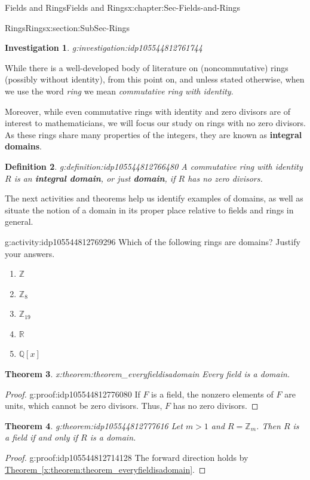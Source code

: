\documentclass[oneside,10pt,]{book}
\newcommand{\xreffont}{\relax}
\newcommand{\terminology}[1]{\textbf{#1}}
\numberwithin{equation}{section}
\def\Z{{\mathbb Z}}
\def\Q{{\mathbb Q}}
\def\R{{\mathbb R}}
\newtheorem{theorem}{Theorem}[section]
\newtheorem{definition}[theorem]{Definition}
\newtheorem{investigation}[theorem]{Investigation}
\begin{document}
\begin{chapterptx}{Fields and Rings}{}{Fields and Rings}{}{}{x:chapter:Sec-Fields-and-Rings}
\begin{sectionptx}{Rings}{}{Rings}{}{}{x:section:SubSec-Rings}
\begin{investigation}{}{g:investigation:idp105544812761744}
\end{investigation}%
While there is a well-developed body of literature on (noncommutative) rings (possibly without identity), from this point on, and unless stated otherwise, when we use the word \emph{ring} we mean \emph{commutative ring with identity}.%
\par
Moreover, while even commutative rings with identity and zero divisors are of interest to mathematicians, we will focus our study on rings with no zero divisors. As these rings share many properties of the integers, they are known as \terminology{integral domains}.%
\begin{definition}{}{g:definition:idp105544812766480}%
%
%
A commutative ring with identity \(R\) is an \terminology{integral domain}, or just \terminology{domain}, if \(R\) has no zero divisors.%
\end{definition}
The next activities and theorems help us identify examples of domains, as well as situate the notion of a domain in its proper place relative to fields and rings in general.%
\begin{activity}{}{g:activity:idp105544812769296}%
Which of the following rings are domains? Justify your answers.%
\begin{enumerate}
\item{}\(\displaystyle \Z\)%
\item{}\(\displaystyle \Z_{8}\)%
\item{}\(\displaystyle \Z_{19}\)%
\item{}\(\displaystyle \R\)%
\item{}\(\displaystyle \Q[x]\)%
\end{enumerate}
%
\end{activity}%
\begin{theorem}{}{}{x:theorem:theorem_everyfieldisadomain}%
Every field is a domain.%
\end{theorem}
\begin{proof}{}{g:proof:idp105544812776080}
If \(F\) is a field, the nonzero elements of \(F\) are units, which cannot be zero divisors. Thus, \(F\) has no zero divisors.%
\end{proof}
\begin{theorem}{}{}{g:theorem:idp105544812777616}%
Let \(m > 1\) and \(R = \Z_m\). Then \(R\) is a field if and only if \(R\) is a domain.%
\end{theorem}
\begin{proof}{}{g:proof:idp105544812714128}
The forward direction holds by \hyperref[x:theorem:theorem_everyfieldisadomain]{Theorem~{\xreffont\ref{x:theorem:theorem_everyfieldisadomain}}}.%

\end{proof}
\end{sectionptx}
\end{chapterptx}
\end{document}
